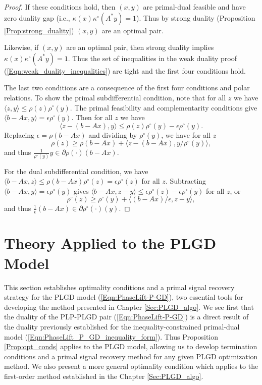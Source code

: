 \begin{proof}
If these conditions hold, then $(x, y)$ are primal-dual feasible and have zero duality gap (i.e., $\kappa(x) \kappa^\circ(A^*y) =1$).  Thus by strong duality (Proposition \ref{Prop:strong_duality}) $(x, y)$ are an optimal pair.

Likewise, if $(x, y)$ are an optimal pair, then strong duality implies $\kappa(x) \kappa^\circ(A^*y) = 1$.  Thus the set of inequalities in the weak duality proof (\ref{Eqn:weak_duality_inequalities}) are tight and the first four conditions hold.  

The last two conditions are a consequence of the first four conditions and polar relations.  To show the primal subdifferential condition, note that for all $z$ we have $\langle z, y \rangle \leq \rho(z) \rho^\circ(y)$.  The primal feasibility and complementarity conditions give $\langle b - Ax, y \rangle = \epsilon \rho^\circ(y)$.  Then for all $z$ we have
\[
\langle z - (b-Ax), y \rangle \leq \rho(z) \rho^\circ(y) - \epsilon \rho^\circ(y).
\]
Replacing $\epsilon = \rho(b-Ax)$ and dividing by $\rho^\circ(y)$, we have for all $z$
\[
\rho(z) \geq \rho(b-Ax) + \langle z - (b-Ax), y/\rho^\circ(y)\rangle,
\]
and thus $\frac{1}{\rho^\circ(y)}y	\in \partial \rho(\cdot) (b-Ax)$.

For the dual subdifferential condition, we have $\langle b - Ax, z \rangle \leq \rho(b-Ax) \rho^\circ(z) = \epsilon \rho^\circ(z)$ for all $z$.  Subtracting $\langle b - Ax, y \rangle = \epsilon \rho^\circ(y)$ gives $\langle b-Ax, z-y \rangle \leq \epsilon \rho^\circ(z) - \epsilon \rho^\circ(y)$ for all $z$, or
\[
\rho^\circ(z) \geq \rho^\circ(y) + \langle(b-Ax)/\epsilon, z-y\rangle,
\]
and thus $\frac{1}{\epsilon}(b - Ax) \in \partial \rho^\circ(\cdot) (y)$.


\end{proof}








\section{Theory Applied to the PLGD Model}   \label{Subsec:PLGD-opt_conds_primal_recovery}



This section establishes optimality conditions and a primal signal recovery strategy for the PLGD model (\ref{Eqn:PhaseLift-P-GD}), two essential tools for developing the method presented in Chapter \ref{Sec:PLGD_algo}.  
We see first that the duality of the PLP-PLGD pair (\ref{Eqn:PhaseLift-P-GD}) is a direct result of the duality previously established for the inequality-constrained primal-dual model (\ref{Eqn:PhaseLift_P_GD_inequality_form}).  
Thus Proposition \ref{Prop:opt_conds} applies to the PLGD model, allowing us to develop termination conditions and a primal signal recovery method for any given PLGD optimization method.  
We also present a more general optimality condition which applies to the first-order method established in the Chapter \ref{Sec:PLGD_algo}.





